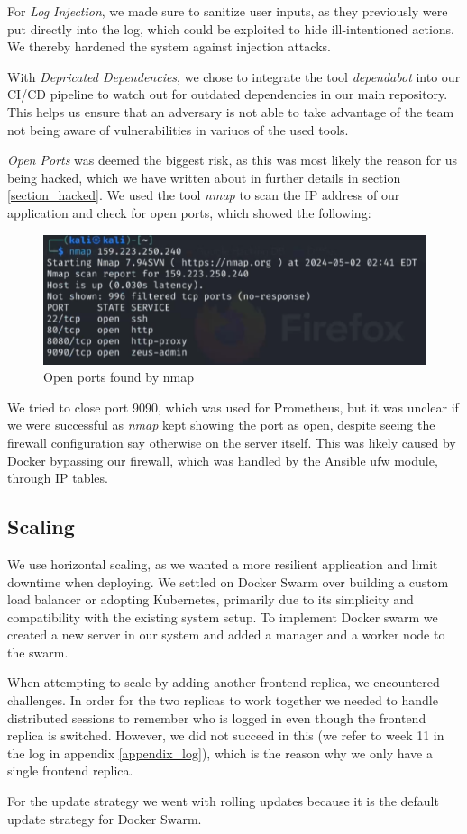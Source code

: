For \textit{Log Injection}, we made sure to sanitize user inputs, as they previously were put directly into the log, which could be exploited to hide ill-intentioned actions. We thereby hardened the system against injection attacks.

With \textit{Depricated Dependencies}, we chose to integrate the tool \textit{dependabot} into our CI/CD pipeline to watch out for outdated dependencies in our main repository. This helps us ensure that an adversary is not able to take advantage of the team not being aware of vulnerabilities in variuos of the used tools.

\textit{Open Ports} was deemed the biggest risk, as this was most likely the reason for us being hacked, which we have written about in further details in section \ref{section_hacked}. We used the tool \textit{nmap} to scan the IP address of our application and check for open ports, which showed the following:
\begin{figure}[H]
    \centering
    \includegraphics[width=1\linewidth]{images/nmap.png}
    \caption{Open ports found by nmap}
    \label{fig:matrix}
\end{figure}
We tried to close port 9090, which was used for Prometheus, but it was unclear if we were successful as \textit{nmap} kept showing the port as open, despite seeing the firewall configuration say otherwise on the server itself. This was likely caused by Docker bypassing our firewall, which was handled by the Ansible ufw module, through IP tables.

\subsection{Scaling}
We use horizontal scaling, as we wanted a more resilient application and limit downtime when deploying. We settled on Docker Swarm over building a custom load balancer or adopting Kubernetes, primarily due to its simplicity and compatibility with the existing system setup. To implement Docker swarm we created a new server in our system and added a manager and a worker node to the swarm.

When attempting to scale by adding another frontend replica, we encountered challenges. In order for the two replicas to work together we needed to handle distributed sessions to remember who is logged in even though the frontend replica is switched. However, we did not succeed in this (we refer to week 11 in the log in appendix \ref{appendix_log}), which is the reason why we only have a single frontend replica.

For the update strategy we went with rolling updates because it is the default update strategy for Docker Swarm.
